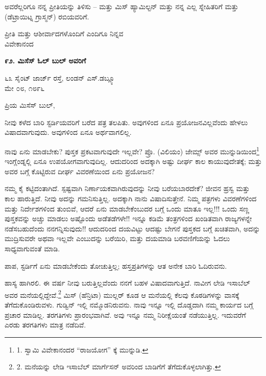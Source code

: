 ಅವರೆಲ್ಲರಿಗೂ ನನ್ನ ಪ್ರೀತಿಯನ್ನು ತಿಳಿಸು – ಮತ್ತು ಮಿಸ್ ಹ್ಯಾಮಿಲ್ಟನ್ ಮತ್ತು ನನ್ನ ಎಲ್ಲ ಸ್ನೇಹಿತರಿಗೆ ಮತ್ತು (ಡೆಟ್ರಾಯಿಟ್ನ ಗ್ರಾಸ್ಮನ್) ರಬಿಯವರಿಗೆ.

\begin{flushright}
ಪ್ರೀತಿ ಮತ್ತು ಆಶೀರ್ವಾದಗಳೊಂದಿಗೆ ಎಂದಿಗೂ ನಿನ್ನವ\\ವಿವೇಕಾನಂದ
\end{flushright}

\begin{center}
\textbf{೯೨. ಮಿಸೆಸ್ ಓಲ್ ಬುಲ್ ಅವರಿಗೆ}
\end{center}

\begin{flushright}
೬೩ ಸೈಂಟ್ ಜಾರ್ಜ್ ರಸ್ತೆ, ಲಂಡನ್ ಎಸ್.ಡಬ್ಲ್ಯೂ\\ಮೇ ೦೮, ೧೮೯೬
\end{flushright}

ಪ್ರಿಯ ಮಿಸೆಸ್ ಬುಲ್,

ನೀವು ಕಳೆದ ಬಾರಿ ಸ್ಟರ್ಡಿಯವರಿಗೆ ಬರೆದ ಪತ್ರ ತಲಪಿತು. ಅವುಗಳಿಂದ ಏನೂ ಪ್ರಯೋಜನವಿಲ್ಲವೆಂದು ಹೇಳಲು ವಿಷಾದವಾಗುವುದು. ಅವುಗಳಿಂದ ಏನೂ ಅರ್ಥವಾಗಲಿಲ್ಲ.

ನಾವು ಏನು ಮಾಡಬೇಕು? ಪುಸ್ತಕ ಪ್ರಕಟವಾಗುವುದೇ ಇಲ್ಲವೇ? ಪ್ರೊ. (ವಿಲಿಯಂ) ಜೇಮ್ಸ್ ಅವರ ಮುನ್ನುಡಿಯಿಂದ\footnote{1. ಸ್ವಾಮಿ ವಿವೇಕಾನಂದರ “ರಾಜಯೋಗ” ಕ್ಕೆ ಮುನ್ನುಡಿ.} ಇಂಗ್ಲೆಂಡ್ನಲ್ಲಿ ಏನೂ ಉಪಯೋಗವಾಗುವುದಿಲ್ಲ. ಆದುದರಿಂದ ಅದಕ್ಕಾಗಿ ಅಷ್ಟು ದೀರ್ಘ ಕಾಲ ಕಾಯುವುದೇತಕ್ಕೆ; ಮತ್ತು ಅವರ ಬಗ್ಗೆ ಕೊಟ್ಟಿರುವ ದೀರ್ಘ ವಿವರಣೆಯಿಂದ ಏನು ಪ್ರಯೋಜನ?

ನಮ್ಮ ಕೈ ಕಟ್ಟಿದಂತಾಗಿದೆ. ಸ್ಪಷ್ಟವಾಗಿ ನಿರ್ಣಾಯಕವಾಗಿರುವುದನ್ನು ನೀವು ಬರೆಯಬಾರದೇಕೆ? ಜೀವನ ಹ್ರಸ್ವ ಮತ್ತು ಕಾಲ ಹಾರುತ್ತಿದೆ. ನೀವು ಅದನ್ನು ಗಮನಿಸುತ್ತಿಲ್ಲ. ಅದಕ್ಕಾಗಿ ನಾನು ವಿಷಾದಿಸುತ್ತೇನೆ. ನಿಮ್ಮ ಪತ್ರಗಳು ವಿವರಣೆಗಳಿಂದ ಮತ್ತು ನಿರ್ದೇಶಗಳಿಂದ ತುಂಬಿವೆ, ಆದರೆ ಏನು ಮಾಡಬೇಕೆಂಬುದರ ಬಗ್ಗೆ ಒಂದು ಮಾತೂ ಇಲ್ಲ!!! ಒಂದು ಸಣ್ಣ ಪುಸ್ತಕವನ್ನು ಅಚ್ಚು ಮಾಡಲು ಅಷ್ಟೊಂದು ಅಡೆತಡೆಗಳೇ!! ಇನ್ನೂ ಕಡಿಮೆ ತಂತ್ರಗಳಿಂದ ಖಂಡಿತವಾಗಿ ರಾಜ್ಯಗಳನ್ನೇ ನಡೆಸಬಹುದೆಂದು ನನಗನ್ನಿಸುವುದು!! ಆದುದರಿಂದ ದಯವಿಟ್ಟು ಆದಷ್ಟು ಬೇಗನೆ ಪುಸ್ತಕದ ಬಗ್ಗೆ ಖಚಿತವಾಗಿ, ಅದನ್ನು ಮುದ್ರಿಸುವರೇ ಅಥವಾ ಇಲ್ಲವೇ ಎಂಬುದನ್ನು ಬರೆಯಿರಿ, ಮತ್ತು ದಯಮಾಡಿ ಬರವಣಿಗೆಯನ್ನು ಓದಲು ಸಾಧ್ಯವಾಗುವಂತೆ ಮಾಡಿ.

ಪಾಪ, ಸ್ಟರ್ಡಿಗೆ ಏನು ಮಾಡಬೇಕೆಂದು ತೋಚುತ್ತಿಲ್ಲ; ಹಸ್ತಪ್ರತಿಗಳನ್ನು ಆತ ಅನೇಕ ಬಾರಿ ಓದಿರುವನು.

ಹಾಸ್ಯ ಹಾಗಿರಲಿ. ಈ ವರ್ಷ ನೀವು ಬರುತ್ತಿಲ್ಲವೆಂದು ನನಗೆ ಬಹಳ ವಿಷಾದವಾಗುತ್ತಿದೆ. ನಾವೀಗ ಲೇಡಿ ಇಸಾಬೆಲ್ ಅವರ ಮನೆಯಲ್ಲಿದ್ದೇವೆ.\footnote{2. ಮನೆಯನ್ನು ಲೇಡಿ ಇಸಾಬೆಲ್ ಮಾರ್ಗೆಸನ್ ಅವರಿಂದ ಬಾಡಿಗೆಗೆ ತೆಗೆದುಕೊಳ್ಳಲಾಗಿತ್ತು.} ಮಿಸ್ (ಹೆನ್ರಿಟಾ) ಮುಲ್ಲರ್ ಕೂಡ ಆ ಮನೆಯಲ್ಲಿ ಕೆಲವು ಕೊಠಡಿಗಳನ್ನು ವಾಸಕ್ಕೆ ತೆಗೆದುಕೊಂಡಿರುವಳು. ಗುಡ್ವಿನ್ ಇಲ್ಲಿ ನಮ್ಮೊಡನಿರುವನು. ನಾವು ಇನ್ನೂ ಇಲ್ಲಿ ದೊಡ್ಡದಾಗಿ ನಮ್ಮ ಕಾರ್ಯದ ಬಗ್ಗೆ ಪ್ರಚಾರ ಮಾಡಿಲ್ಲ. ತರಗತಿಗಳು ಪ್ರಾರಂಭವಾಗಿವೆ. ಅವು ಇನ್ನೂ ನಮ್ಮ ನಿರೀಕ್ಷೆಯಂತೆ ನಡೆಯುತ್ತಿಲ್ಲ. ಇದುವರೆಗೆ ಎರಡು ತರಗತಿಗಳು ಮಾತ್ರ ನಡೆದಿವೆ.

